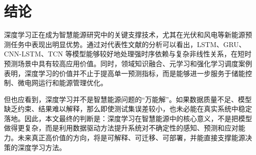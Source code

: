 \section{结论}
深度学习正在成为智慧能源研究中的关键支撑技术，尤其在光伏和风电等新能源预测任务中表现出明显优势。通过对代表性文献的分析可以看出，LSTM、GRU、CNN-LSTM、TCN 等模型能够较好地处理强时序依赖与复杂非线性关系，在短时预测场景中具有较高应用价值。同时，领域知识融合、元学习和强化学习调度案例表明，深度学习的价值并不止于提高单一预测指标，而是能够进一步服务于储能控制、微电网运行和能源管理优化。

但也应看到，深度学习并不是智慧能源问题的“万能解”。如果数据质量不足、模型缺乏约束、结果难以解释，那么即使测试集误差较小，也未必能在真实系统中稳定落地。因此，本文最终的判断是：深度学习在智慧能源中的核心意义，不是把模型做得更复杂，而是利用数据驱动方法提升系统对不确定性的感知、预测和应对能力。未来真正高价值的方向，将是可解释、可迁移、可部署，并能直接支撑能源决策的深度学习方法。

\newpage